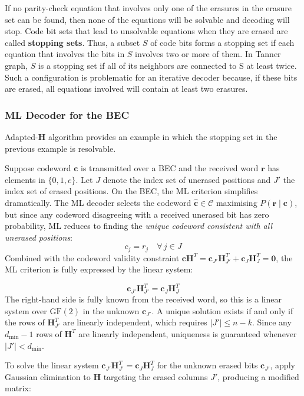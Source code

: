\documentclass[11pt]{article}
\begin{document}
If no parity-check equation that involves only one of the erasures in the erasure set can be found, then none of the equations will be solvable and decoding will stop. Code bit sets that lead to unsolvable equations when they are erased are called \textbf{stopping sets}. Thus, a subset $S$ of code bits forms a stopping set if each equation that involves the bits in $S$ involves two or more of them. In Tanner graph, $S$ is a stopping set if all of its neighbors are connected to S at least twice. Such a configuration is problematic for an iterative decoder because, if these bits are erased, all equations involved will contain at least two erasures.

\subsubsection{ML Decoder for the BEC}
Adapted-\textbf{H} algorithm provides an example in which the stopping set
in the previous example is resolvable.

Suppose codeword $\mathbf{c}$ is transmitted over a BEC and the received word 
$\mathbf{r}$ has elements in $\{0, 1, e\}$. Let $J$ denote the index set of 
unerased positions and $J'$ the index set of erased positions. On the BEC, the ML criterion simplifies dramatically. The ML decoder selects the codeword $\hat{\mathbf{c}} \in \mathcal{C}$ maximising $P(\mathbf{r} \mid \mathbf{c})$, but since any codeword disagreeing with a received unerased bit has zero probability, ML reduces to finding the \textit{unique codeword consistent with all unerased positions}: 
\[
c_j = r_j \quad \forall\, j \in J
\]
Combined with the codeword validity constraint $\mathbf{c}\mathbf{H}^T = \mathbf{c}_{J'}\mathbf{H}_{J'}^T + \mathbf{c}_J \mathbf{H}_J^T = \mathbf{0}$, the ML criterion is fully expressed by the linear system:

\[
    \mathbf{c}_{J'}\mathbf{H}_{J'}^T = \mathbf{c}_J\mathbf{H}_J^T
\]
The right-hand side is fully known from the received word, so this is a linear 
system over $\text{GF}(2)$ in the unknown $\mathbf{c}_{J'}$. A unique solution 
exists if and only if the rows of $\mathbf{H}_{J'}^T$ are linearly independent, 
which requires $|J'| \leq n - k$. Since any $d_{\min} - 1$ rows of $\mathbf{H}^T$ 
are linearly independent, uniqueness is guaranteed whenever $|J'| < d_{\min}$.

To solve the linear system $\mathbf{c}_{J'}\mathbf{H}_{J'}^T = \mathbf{c}_J\mathbf{H}_J^T$ 
for the unknown erased bits $\mathbf{c}_{J'}$, apply Gaussian elimination to 
$\mathbf{H}$ targeting the erased columns $J'$, producing a modified matrix:
\end{document}
